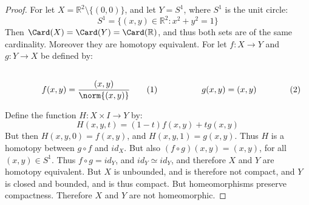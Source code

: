 \documentclass{article}                                                        %
\begin{document}
        \begin{proof}
            For let $X=\mathbb{R}^{2}\setminus\{(0,0)\}$,
            and let $Y=S^{1}$, where $S^{1}$ is the unit circle:
            \begin{equation}
                S^{1}=\{(x,y)\in\mathbb{R}^{2}:x^{2}+y^{2}=1\}
            \end{equation}
            Then $\Card(X)=\Card(Y)=\Card(\mathbb{R})$, and thus
            both sets are of the same cardinality. Moreover they
            are homotopy equivalent. For let $f:{X}\rightarrow{Y}$ and
            $g:{Y}\rightarrow{X}$ be defined by:
            \par
            \begin{subequations}
                \begin{minipage}[b]{0.49\textwidth}
                    \centering
                    \begin{equation}
                        f(x,y)=\frac{(x,y)}{\norm{(x,y)}}
                    \end{equation}
                \end{minipage}
                \hfill
                \begin{minipage}[b]{0.49\textwidth}
                    \centering
                    \begin{equation}
                        g(x,y)=(x,y)
                    \end{equation}
                \end{minipage}
            \end{subequations}
            \par\vspace{2.5ex}
            Define the function $H:X\times{I}\rightarrow{Y}$ by:
            \begin{equation}
                H(x,y,t)=(1-t)f(x,y)+tg(x,y)
            \end{equation}
            But then $H(x,y,0)=f(x,y)$, and $H(x,y,1)=g(x,y)$. Thus $H$ is a
            homotopy between ${g}\circ{f}$ and $id_{X}$. But also
            $({f}\circ{g})(x,y)=(x,y)$, for all $(x,y)\in S^{1}$.
            Thus ${f}\circ{g}=id_{Y}$, and ${id_{Y}}\simeq{id_{Y}}$,
            and therefore $X$ and $Y$ are homotopy equivalent.
            But $X$ is unbounded, and is therefore not compact,
            and $Y$ is closed and bounded, and is thus compact.
            But homeomorphisms preserve compactness. Therefore $X$
            and $Y$ are not homeomorphic.
        \end{proof}
\end{document}
